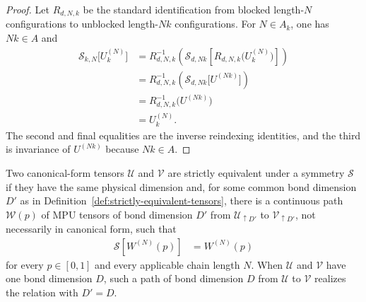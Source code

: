 \begin{proof}\leanok
    Let $R_{d,N,k}$ be the standard identification from blocked length-$N$
    configurations to unblocked length-$Nk$ configurations. For $N\in A_k$,
    one has $Nk\in A$ and
    \begin{align}
        \mathcal S_{k,N}\bigl[U_k^{(N)}\bigr]
         & = R_{d,N,k}^{-1}\!\left(
        \mathcal S_{d,Nk}\!\left[
                R_{d,N,k}\bigl(U_k^{(N)}\bigr)
        \right]\right)                               \\
         & = R_{d,N,k}^{-1}\!\left(
        \mathcal S_{d,Nk}\bigl[U^{(Nk)}\bigr]\right) \\
         & = R_{d,N,k}^{-1}\bigl(U^{(Nk)}\bigr)      \\
         & = U_k^{(N)}.
    \end{align}
    The second and final equalities are the inverse reindexing identities, and
    the third is invariance of $U^{(Nk)}$ because $Nk\in A$.
\end{proof}

\begin{definition}
    \label{def:strictly-equivalent-symmetry}
    \leanok
    Two canonical-form tensors $\mathcal U$
    and $\mathcal V$ are strictly equivalent under a symmetry $\mathcal S$ if
    they have the same physical dimension and, for some common bond dimension
    $D'$ as in Definition~\ref{def:strictly-equivalent-tensors}, there is a
    continuous path $\mathcal W(p)$ of MPU tensors of bond dimension $D'$ from
    $\mathcal U_{\uparrow D'}$ to $\mathcal V_{\uparrow D'}$,
    not necessarily in canonical form, such that
    \begin{align}
        \mathcal S[W^{(N)}(p)] & =W^{(N)}(p)
    \end{align}
    for every $p\in[0,1]$ and every applicable chain length $N$. When
    $\mathcal U$ and $\mathcal V$ have one bond dimension $D$, such a path of
    bond dimension $D$ from $\mathcal U$ to $\mathcal V$ realizes the relation
    with $D'=D$.
\end{definition}


